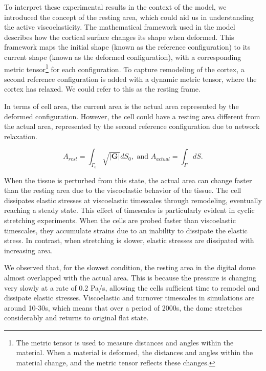 To interpret these experimental results in the context of the model, we introduced the concept of the resting area, which could aid us in understanding the active viscoelasticity. The mathematical framework used in the model describes how the cortical surface changes its shape when deformed. This framework maps the initial shape (known as the reference configuration) to its current shape (known as the deformed configuration), with a corresponding metric tensor\footnote{The metric tensor is used to measure distances and angles within the material. When a material is deformed, the distances and angles within the material change, and the metric tensor reflects these changes.} for each configuration. To capture remodeling of the cortex, a second reference configuration is added with a dynamic metric tensor, where the cortex has relaxed. We could refer to this as the resting frame.

In terms of cell area, the current area is the actual area represented by the deformed configuration. However, the cell could have a resting area different from the actual area, represented by the second reference configuration due to network relaxation.

\begin{equation}
	A_{rest} = \int_{\Gamma_0} \sqrt{|\mathbf{G}|}dS_0, \text{ and } A_{actual} = \int_{\Gamma}dS.
\end{equation}

When the tissue is perturbed from this state, the actual area can change faster than the resting area due to the viscoelastic behavior of the tissue. The cell dissipates elastic stresses at viscoelastic timescales through remodeling, eventually reaching a steady state. This effect of timescales is particularly evident in cyclic stretching experiments. When the cells are probed faster than viscoelastic timescales, they accumulate strains due to an inability to dissipate the elastic stress. In contrast, when stretching is slower, elastic stresses are dissipated with increasing area.

We observed that, for the slowest condition, the resting area in the digital dome almost overlapped with the actual area. This is because the pressure is changing very slowly at a rate of 0.2 Pa/s, allowing the cells sufficient time to remodel and dissipate elastic stresses. Viscoelastic and turnover timescales in simulations are around 10-30s, which means that over a period of 2000s, the dome stretches considerably and returns to original flat state.

